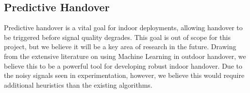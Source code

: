 \subsection{Predictive Handover}
Predictive handover is a vital goal for indoor deployments, allowing handover to be triggered before signal quality degrades. This goal is out of scope for this project, but we believe it will be a key area of research in the future. Drawing from the extensive literature on using Machine Learning in outdoor handover, we believe this to be a powerful tool for developing robust indoor handover. Due to the noisy signals seen in experimentation, however, we believe this would require additional heuristics than the existing algorithms.

